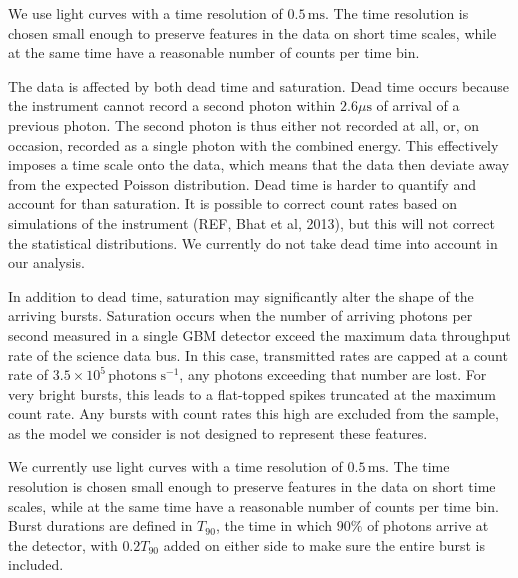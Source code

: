 \documentclass[12pt]{emulateapj}
\newcommand{\project}[1]{\textsl{#1}}
\newcommand{\RXTE}{\project{RXTE}}
\newcommand{\counts}{y}
\begin{document}
We use light curves with a time resolution of $0.5\,\mathrm{ms}$. The time resolution is chosen small enough to preserve features
in the data on short time scales, while at the same time have a reasonable number of counts per time bin. 

The data is affected by both dead time and saturation. 
Dead time occurs because the instrument cannot record a second photon within $2.6\mu\mathrm{s}$ of arrival of a previous photon. 
The second photon is thus either not recorded at all, or, on occasion, recorded as a single photon with the combined energy. This effectively 
imposes a time scale onto the data, which means that the data then deviate away from the expected Poisson distribution. 
Dead time is harder to quantify and account for than saturation. It is possible to correct count rates based on simulations of the instrument (REF, Bhat et al, 2013),
but this will not correct the statistical distributions. We currently do not take dead time into account in our analysis. 

In addition to dead time, saturation may significantly alter the shape of the arriving bursts. Saturation occurs when the number of arriving photons per second
measured in a single GBM detector exceed the maximum data throughput rate of the science data bus. In this case, transmitted rates are capped at a 
count rate of $3.5 \times 10^{5} \, \mathrm{photons} \; \mathrm{s}^{-1}$, any photons exceeding that number are lost. For very bright bursts, this leads
to a flat-topped spikes truncated at the maximum count rate. Any bursts with count rates this high are excluded from the sample, as the model we
consider is not designed to represent these features. 

We currently use light curves with a time resolution of $0.5\,\mathrm{ms}$. The time resolution is chosen small enough to preserve features
in the data on short time scales, while at the same time have a reasonable number of counts per time bin. 
Burst durations are defined in $T_{90}$, the time in which $90\%$ of photons arrive at the detector, with $0.2T_{90}$ added on either side
to make sure the entire burst is included. 


\end{document}
